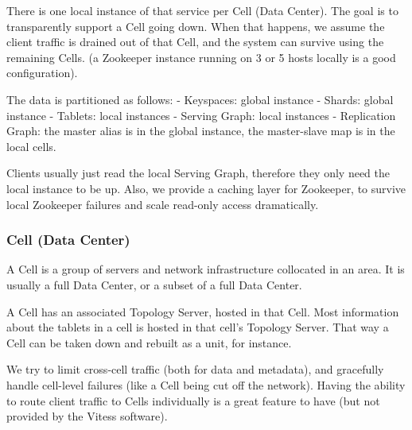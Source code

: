 There is one local instance of that service per Cell (Data Center). The goal is to transparently support a Cell going down. When that happens, we assume the client traffic is drained out of that Cell, and the system can survive
using the remaining Cells. (a Zookeeper instance running on 3 or 5 hosts locally is a good configuration).

The data is partitioned as follows:
- Keyspaces: global instance
- Shards: global instance
- Tablets: local instances
- Serving Graph: local instances
- Replication Graph: the master alias is in the global instance, the master-slave map is in the local cells.

Clients usually just read the local Serving Graph, therefore they only need the local instance to be up. Also, we provide a caching layer for Zookeeper, to survive local Zookeeper failures and scale read-only access dramatically.

\subsubsection{Cell (Data Center)}\hypertarget{cell-data-center}{}\label{cell-data-center}

A Cell is a group of servers and network infrastructure collocated in an area. It is usually a full Data Center, or a subset of a full Data Center.

A Cell has an associated Topology Server, hosted in that Cell. Most information about the tablets in a cell is hosted in that cell's Topology Server. That way a Cell can be taken down and rebuilt as a unit, for instance.

We try to limit cross-cell traffic (both for data and metadata), and gracefully handle cell-level failures (like a Cell being cut off the network). Having the ability to route client traffic to Cells individually is a great feature to have
(but not provided by the Vitess software).

